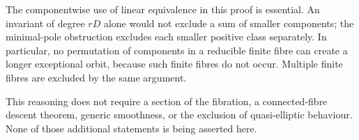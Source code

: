 The componentwise use of linear equivalence in this proof is essential.
An invariant of degree \(rD\) alone would not exclude a sum of
smaller components; the minimal-pole obstruction excludes each smaller
positive class separately. In particular, no permutation of components
in a reducible finite fibre can create a longer exceptional orbit,
because such finite fibres do not occur. Multiple finite fibres are
excluded by the same argument.

This reasoning does not require a section of the fibration, a
connected-fibre descent theorem, generic smoothness, or the exclusion
of quasi-elliptic behaviour. None of those additional statements is
being asserted here.
